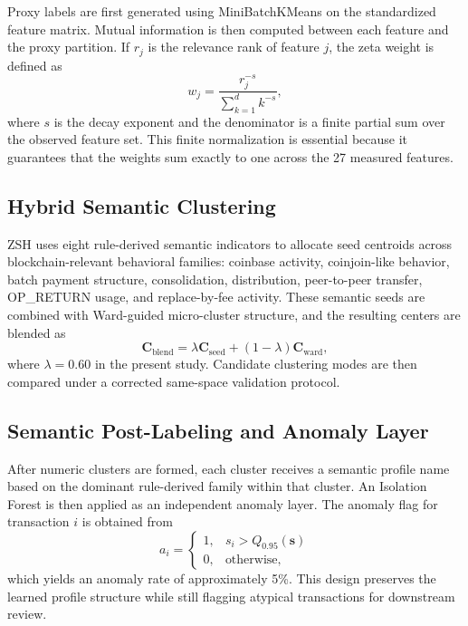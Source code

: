 \documentclass{ieeeaccess}
\begin{document}
Proxy labels are first generated using MiniBatchKMeans on the standardized feature matrix. Mutual information is then computed between each feature and the proxy partition. If $r_j$ is the relevance rank of feature $j$, the zeta weight is defined as
\begin{equation}
w_j = \frac{r_j^{-s}}{\sum_{k=1}^{d} k^{-s}},
\end{equation}
where $s$ is the decay exponent and the denominator is a finite partial sum over the observed feature set. This finite normalization is essential because it guarantees that the weights sum exactly to one across the 27 measured features.

\subsection{Hybrid Semantic Clustering}

ZSH uses eight rule-derived semantic indicators to allocate seed centroids across blockchain-relevant behavioral families: coinbase activity, coinjoin-like behavior, batch payment structure, consolidation, distribution, peer-to-peer transfer, OP\_RETURN usage, and replace-by-fee activity. These semantic seeds are combined with Ward-guided micro-cluster structure, and the resulting centers are blended as
\begin{equation}
\mathbf{C}_{\text{blend}} = \lambda \mathbf{C}_{\text{seed}} + (1-\lambda)\mathbf{C}_{\text{ward}},
\end{equation}
where $\lambda = 0.60$ in the present study. Candidate clustering modes are then compared under a corrected same-space validation protocol.

\subsection{Semantic Post-Labeling and Anomaly Layer}

After numeric clusters are formed, each cluster receives a semantic profile name based on the dominant rule-derived family within that cluster. An Isolation Forest is then applied as an independent anomaly layer. The anomaly flag for transaction $i$ is obtained from
\begin{equation}
a_i =
\begin{cases}
1, & s_i > Q_{0.95}(\mathbf{s}) \\
0, & \text{otherwise},
\end{cases}
\end{equation}
which yields an anomaly rate of approximately 5\%. This design preserves the learned profile structure while still flagging atypical transactions for downstream review.
\end{document}
